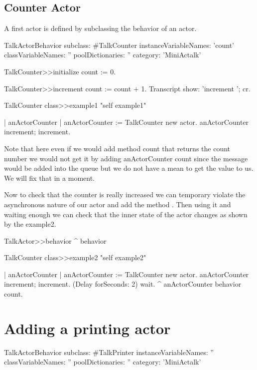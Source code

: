 \documentclass[a4paper,10pt,twoside]{book}
\begin{document}
\subsection{Counter Actor}
A first actor is defined by subclassing the behavior of an actor.

\begin{classdef}{}
TalkActorBehavior subclass: #TalkCounter
	instanceVariableNames: 'count'
	classVariableNames: ''
	poolDictionaries: ''
	category: 'MiniActalk'
\end{classdef}

\begin{method}{}
TalkCounter>>initialize
	count := 0.

TalkCounter>>increment
	count := count + 1.
	Transcript show: 'increment '; cr.
\end{method}
	
	
\begin{method}{}
TalkCounter class>>example1
	"self example1"

	| anActorCounter |
	anActorCounter := TalkCounter new actor.
	anActorCounter increment; increment.	
\end{method}



Note that here even if we would add method count that returns the count number
we would not get it by adding anActorCounter count since the message would be added into the queue
but we do not have a mean to get the value to us. We will fix that in a moment.

Now to check that the counter is really increased we can temporary violate the asynchronous
nature of our actor and add the method . Then using it and waiting enough we can check that the 
inner state of the actor changes as shown by the example2. 

\begin{method}{}
TalkActor>>behavior
	^ behavior
\end{method}

\begin{method}{}
TalkCounter class>>example2
	"self example2"
	
	| anActorCounter |
	anActorCounter := TalkCounter new actor.
	anActorCounter increment; increment.
	(Delay forSeconds: 2) wait.
	^ anActorCounter behavior count. 
\end{method}

\section{Adding a printing actor}
\begin{classdef}{}
TalkActorBehavior subclass: #TalkPrinter
	instanceVariableNames: ''
	classVariableNames: ''
	poolDictionaries: ''
	category: 'MiniActalk'
\end{classdef}
\end{document}
